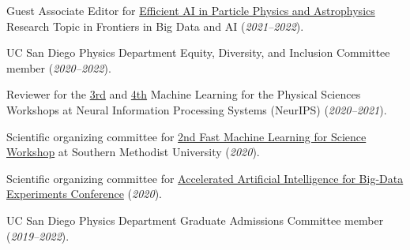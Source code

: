\documentclass[11pt]{res}
\begin{document}
\begin{resume}
  Guest Associate Editor for \href{https://www.frontiersin.org/research-topics/19095/efficient-ai-in-particle-physics-and-astrophysics}{Efficient AI in Particle Physics and Astrophysics} Research Topic in Frontiers in Big Data and AI (\textit{2021--2022}).

  UC San Diego Physics Department Equity, Diversity, and Inclusion Committee member (\textit{2020--2022}).

  Reviewer for the \href{https://ml4physicalsciences.github.io/2020/}{3rd} and \href{https://ml4physicalsciences.github.io/2021/}{4th} Machine Learning for the Physical Sciences Workshops at Neural Information Processing Systems (NeurIPS) (\textit{2020--2021}).

  Scientific organizing committee for \href{https://indico.cern.ch/e/fml2020}{2nd Fast Machine Learning for Science Workshop} at Southern Methodist University (\textit{2020}).

  Scientific organizing committee for \href{http://www.ncsa.illinois.edu/Conferences/AcceleratedAINCSA/}{Accelerated Artificial Intelligence for Big-Data Experiments Conference} (\textit{2020}).

  UC San Diego Physics Department Graduate Admissions Committee member (\textit{2019--2022}).

\end{resume}
\end{document}
